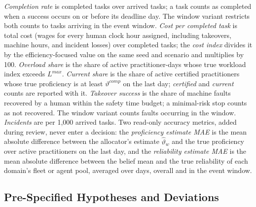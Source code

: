 \documentclass[utf8]{frontiers_suppmat}
\begin{document}
\textit{Completion rate} is completed tasks over arrived tasks; a task counts as completed when a success occurs on or before its deadline day. The window variant restricts both counts to tasks arriving in the event window. \textit{Cost per completed task} is total cost (wages for every human clock hour assigned, including takeovers, machine hours, and incident losses) over completed tasks; the \textit{cost index} divides it by the efficiency-focused value on the same seed and scenario and multiplies by 100. \textit{Overload share} is the share of active practitioner-days whose true workload index exceeds $L^{max}$. \textit{Current share} is the share of active certified practitioners whose true proficiency is at least $\vartheta^{comp}$ on the last day; \textit{certified} and \textit{current} counts are reported with it. \textit{Takeover success} is the share of machine faults recovered by a human within the safety time budget; a minimal-risk stop counts as not recovered. The window variant counts faults occurring in the window. \textit{Incidents} are per 1,000 arrived tasks. Two read-only accuracy metrics, added during review, never enter a decision: the \textit{proficiency estimate MAE} is the mean absolute difference between the allocator's estimate $\hat\vartheta_w$ and the true proficiency over active practitioners on the last day, and the \textit{reliability estimate MAE} is the mean absolute difference between the belief mean and the true reliability of each domain's fleet or agent pool, averaged over days, overall and in the event window.

\subsection{Pre-Specified Hypotheses and Deviations}
\label{app:protocol-hypotheses}
\end{document}
